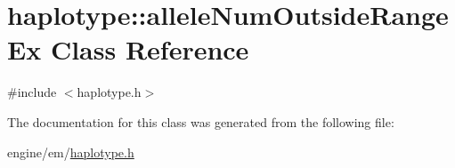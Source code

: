 \hypertarget{classhaplotype_1_1alleleNumOutsideRangeEx}{
\section{haplotype::alleleNumOutsideRangeEx Class Reference}
\label{classhaplotype_1_1alleleNumOutsideRangeEx}
}


{\ttfamily \#include $<$haplotype.h$>$}



The documentation for this class was generated from the following file:\begin{DoxyCompactItemize}
\item 
engine/em/\hyperlink{haplotype_8h}{haplotype.h}\end{DoxyCompactItemize}
